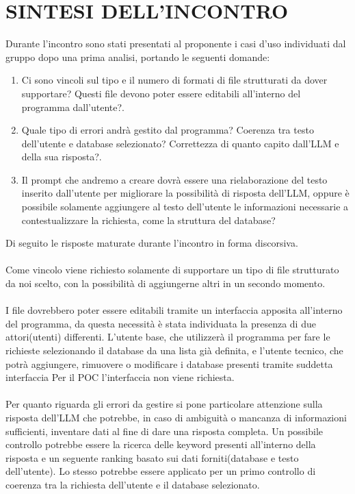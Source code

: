 \documentclass[5pt]{article}
\begin{document}
\section{SINTESI DELL'INCONTRO}
Durante l'incontro sono stati presentati al proponente i casi d'uso individuati dal gruppo dopo una prima analisi, portando le seguenti domande:
\begin{enumerate}
    \item Ci sono vincoli sul tipo e il numero di formati di file strutturati da dover supportare? Questi file devono poter essere editabili all'interno del programma dall'utente?.
    \item Quale tipo di errori andrà gestito dal programma? Coerenza tra testo dell'utente e database selezionato? Correttezza di quanto capito dall'LLM e della sua risposta?.
    \item Il prompt che andremo a creare dovrà essere una rielaborazione del testo inserito dall'utente per migliorare la possibilità di risposta dell'LLM, oppure è possibile solamente aggiungere al testo dell'utente le informazioni necessarie a contestualizzare la richiesta, come la struttura del database?
\end{enumerate}
Di seguito le risposte maturate durante l'incontro in forma discorsiva. 
\\ \\
Come vincolo viene richiesto solamente di supportare un tipo di file strutturato da noi scelto, con la possibilità di aggiungerne altri in un secondo momento. \\ \\
I file dovrebbero poter essere editabili tramite un interfaccia apposita all'interno del programma, da questa necessità è stata individuata la presenza di due attori(utenti) differenti. L'utente base, che utilizzerà il programma per fare le richieste selezionando il database da una lista già definita, e l'utente tecnico, che potrà aggiungere, rimuovere o modificare i database presenti tramite suddetta interfaccia
Per il POC l'interfaccia non viene richiesta.
\\ \\
Per quanto riguarda gli errori da gestire si pone particolare attenzione sulla risposta dell'LLM che potrebbe, in caso di ambiguità o mancanza di informazioni sufficienti, inventare dati al fine di dare una risposta completa. Un possibile controllo potrebbe essere la ricerca delle keyword presenti all'interno della risposta e un seguente ranking basato sui dati forniti(database e testo dell'utente). Lo stesso potrebbe essere applicato per un primo controllo di coerenza tra la richiesta dell'utente e il database selezionato.\\
\end{document}
